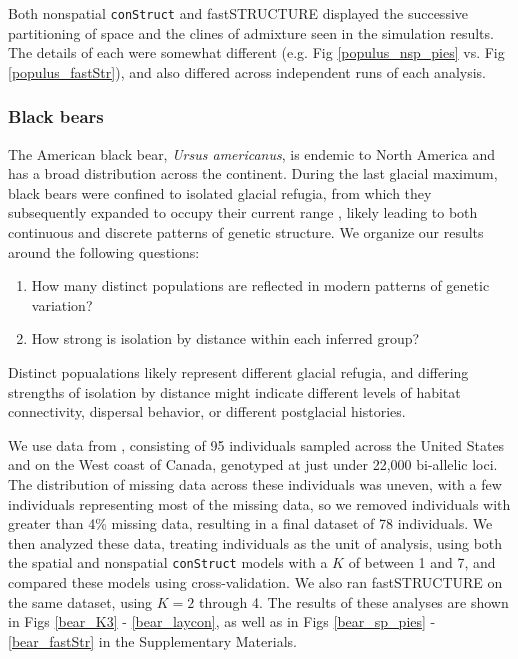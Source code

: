 \documentclass[10pt,letterpaper]{article}
\begin{document}
Both nonspatial \texttt{conStruct} and fastSTRUCTURE displayed 
the successive partitioning of space and the clines of admixture seen in the simulation results.
The details of each were somewhat different 
(e.g. Fig \ref{populus_nsp_pies} vs. Fig \ref{populus_fastStr}), 
and also differed across independent runs of each analysis.


\subsubsection*{Black bears}

The American black bear, \textit{Ursus americanus}, is endemic to North America
and has a broad distribution across the continent.
During the last glacial maximum, 
black bears were confined to isolated glacial refugia, 
from which they subsequently expanded to occupy their current range
\cite{WoodingWard1997,Byun1997,Stone2000,Puckett2015},
likely leading to both continuous and discrete patterns of genetic structure.
We organize our results around the following questions:
\begin{enumerate}
    \item How many distinct populations
        are reflected in modern patterns of genetic variation?
    \item How strong is isolation by distance within each inferred group?
\end{enumerate}
Distinct popualations likely represent different glacial refugia,
and differing strengths of isolation by distance might indicate 
different levels of habitat connectivity,
dispersal behavior,
or different postglacial histories.

We use data from \cite{Puckett2015}, consisting of 95 individuals 
sampled across the United States and on the West coast of Canada,
genotyped at just under 22,000 bi-allelic loci.
The distribution of missing data across these individuals was uneven, 
with a few individuals representing most of the missing data, 
so we removed individuals with greater than 4\% missing data, 
resulting in a final dataset of 78 individuals.
We then analyzed these data, treating individuals as the unit of analysis, 
using both the spatial and nonspatial \texttt{conStruct} models with a $K$ of between 1 and 7, 
and compared these models using cross-validation.
We also ran fastSTRUCTURE \cite{fastStructure} on the same dataset, 
using $K = 2$ through 4.
The results of these analyses are shown in Figs \ref{bear_K3} - \ref{bear_laycon}, 
as well as in Figs \ref{bear_sp_pies} - \ref{bear_fastStr} in the Supplementary Materials.
\end{document}
